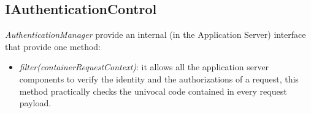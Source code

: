 \subsection{IAuthenticationControl}
\textit{AuthenticationManager} provide an internal (in the Application Server) interface that provide one method:
\label{subsect:IAuthenticationControl}
\begin{itemize}
	\item \textit{filter(containerRequestContext)}: it allows all the application server components to verify the identity and the authorizations of a request, this method practically checks the univocal code contained in every request payload.
\end{itemize}

